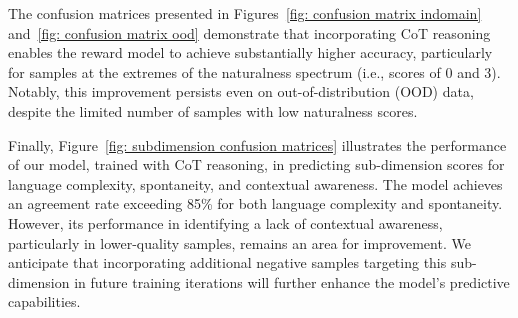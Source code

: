 The confusion matrices presented in Figures~\ref{fig: confusion matrix indomain} and~\ref{fig: confusion matrix ood} demonstrate that incorporating CoT reasoning enables the reward model to achieve substantially higher accuracy, particularly for samples at the extremes of the naturalness spectrum (i.e., scores of 0 and 3). Notably, this improvement persists even on out-of-distribution (OOD) data, despite the limited number of samples with low naturalness scores.

Finally, Figure~\ref{fig: subdimension confusion matrices} illustrates the performance of our model, trained with CoT reasoning, in predicting sub-dimension scores for language complexity, spontaneity, and contextual awareness. The model achieves an agreement rate exceeding 85\% for both language complexity and spontaneity. However, its performance in identifying a lack of contextual awareness, particularly in lower-quality samples, remains an area for improvement. We anticipate that incorporating additional negative samples targeting this sub-dimension in future training iterations will further enhance the model’s predictive capabilities.
